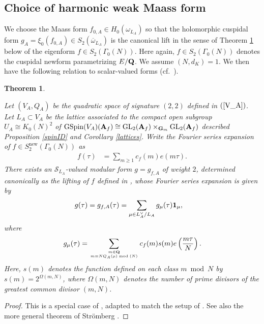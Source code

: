 \documentclass{amsart}
\newtheorem{theorem}{Theorem}[section]
\theoremstyle{definition}
\begin{document}
\subsection{Choice of harmonic weak Maass form} 

We choose the Maass form $f_{0, A} \in H_{0}(\omega_{L_A})$ so that the holomorphic cuspidal form $g_{A} = \xi_0(f_{0, A}) \in S_{2}(\overline{\omega}_{L_A})$
is the canonical lift in the sense of Theorem \ref{YZhang} below of the eigenform $f \in S_2(\Gamma_0(N))$. 
Here again, $f \in S_2(\Gamma_0(N))$ denotes the cuspidal newform parametrizing $E/{\bf{Q}}$.
We assume $(N, d_K)=1$. We then have the following relation to scalar-valued forms (cf.~\cite[$\S$3]{BY}). 

\begin{theorem}\label{YZhang} 

Let $(V_A, Q_A)$ be the quadratic space of signature $(2,2)$ defined in $(\ref{V_A})$.
Let $L_A \subset V_A$ be the lattice associated to the compact open subgroup $U_A \cong K_0(N)^2$ of 
$\operatorname{GSpin}(V_A)({\bf{A}}_f) \cong  \operatorname{GL}_2({\bf{A}}_f) \times_{{\bf{G}}_m} \operatorname{GL}_2({\bf{A}}_f)$ described Proposition \ref{spinID} and Corollary \ref{lattices}.
Write the Fourier series expansion of $f \in S_2^{\operatorname{new}}(\Gamma_0(N))$ as 
\begin{align*} f (\tau) &= \sum\limits_{m \geq 1} c_f(m) e(m \tau). \end{align*}
There exists an $\mathcal{S}_{L_A}$-valued modular form $g = g_{f, A}$ of weight $2$, determined 
canonically as the lifting of $f$ defined in \cite{YZ}, whose Fourier series expansion is given by 
\begin{align*} g(\tau) = g_{f, A}(\tau) &= \sum\limits_{ \mu \in L_A^{\vee}/L_A} g_{\mu}(\tau) {\bf{1}}_{\mu}, \end{align*}
where 
\begin{align*} g_{\mu}(\tau) = \sum\limits_{ m \in {\bf{Q}} \atop m \equiv N Q_A(\mu) \bmod (N) } 
c_f(m) s(m) e \left( \frac{m \tau}{ N} \right). \end{align*}
Here, $s(m)$ denotes the function defined on each class $m \bmod N$ by $s(m) = 2^{\varOmega(m, N)}$, 
where $\varOmega(m, N)$ denotes the number of prime divisors of the greatest common divisor $(m, N)$. \end{theorem} 

\begin{proof} This is a special case of \cite[Theorem 4.15]{YZ}, adapted to match the setup of \cite[p.~639, Lemma 3.1]{BY}. 
See also the more general theorem of Str\"omberg \cite[Theorem 5.2]{Str}.\end{proof}
\end{document}
